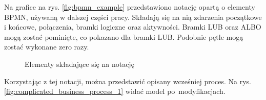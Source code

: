 Na grafice na rys. \ref{fig:bpmn_example} przedstawiono notację opartą o elementy BPMN, używaną w dalszej części pracy. Składają się na nią zdarzenia początkowe i końcowe, połączenia, bramki logiczne oraz aktywności. Bramki LUB oraz ALBO mogą zostać pominięte, co pokazano dla bramki LUB. Podobnie pętle mogą zostać wykonane zero razy.

\begin{figure}[H]
	\caption{\label{fig:bpmn_example}Elementy składające się na notację}
	\label{fig:lifecycle}
\end{figure}

Korzystając z tej notacji, można przedstawić opisany wcześniej proces. Na rys.  \ref{fig:complicated_business_process_1} widać model po~modyfikacjach. 

